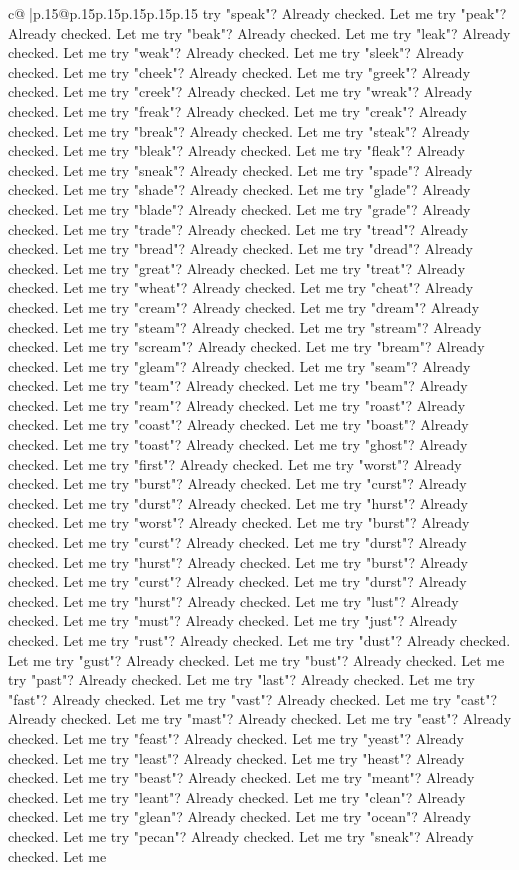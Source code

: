 \documentclass{article}
\begin{document}
{\begin{supertabular}{c@{$\;$}|p{.15\linewidth}@{}p{.15\linewidth}p{.15\linewidth}p{.15\linewidth}p{.15\linewidth}p{.15\linewidth}}
{{{try "speak"? Already checked. Let me try "peak"? Already checked. Let me try "beak"? Already checked. Let me try "leak"? Already checked. Let me try "weak"? Already checked. Let me try "sleek"? Already checked. Let me try "cheek"? Already checked. Let me try "greek"? Already checked. Let me try "creek"? Already checked. Let me try "wreak"? Already checked. Let me try "freak"? Already checked. Let me try "creak"? Already checked. Let me try "break"? Already checked. Let me try "steak"? Already checked. Let me try "bleak"? Already checked. Let me try "fleak"? Already checked. Let me try "sneak"? Already checked. Let me try "spade"? Already checked. Let me try "shade"? Already checked. Let me try "glade"? Already checked. Let me try "blade"? Already checked. Let me try "grade"? Already checked. Let me try "trade"? Already checked. Let me try "tread"? Already checked. Let me try "bread"? Already checked. Let me try "dread"? Already checked. Let me try "great"? Already checked. Let me try "treat"? Already checked. Let me try "wheat"? Already checked. Let me try "cheat"? Already checked. Let me try "cream"? Already checked. Let me try "dream"? Already checked. Let me try "steam"? Already checked. Let me try "stream"? Already checked. Let me try "scream"? Already checked. Let me try "bream"? Already checked. Let me try "gleam"? Already checked. Let me try "seam"? Already checked. Let me try "team"? Already checked. Let me try "beam"? Already checked. Let me try "ream"? Already checked. Let me try "roast"? Already checked. Let me try "coast"? Already checked. Let me try "boast"? Already checked. Let me try "toast"? Already checked. Let me try "ghost"? Already checked. Let me try "first"? Already checked. Let me try "worst"? Already checked. Let me try "burst"? Already checked. Let me try "curst"? Already checked. Let me try "durst"? Already checked. Let me try "hurst"? Already checked. Let me try "worst"? Already checked. Let me try "burst"? Already checked. Let me try "curst"? Already checked. Let me try "durst"? Already checked. Let me try "hurst"? Already checked. Let me try "burst"? Already checked. Let me try "curst"? Already checked. Let me try "durst"? Already checked. Let me try "hurst"? Already checked. Let me try "lust"? Already checked. Let me try "must"? Already checked. Let me try "just"? Already checked. Let me try "rust"? Already checked. Let me try "dust"? Already checked. Let me try "gust"? Already checked. Let me try "bust"? Already checked. Let me try "past"? Already checked. Let me try "last"? Already checked. Let me try "fast"? Already checked. Let me try "vast"? Already checked. Let me try "cast"? Already checked. Let me try "mast"? Already checked. Let me try "east"? Already checked. Let me try "feast"? Already checked. Let me try "yeast"? Already checked. Let me try "least"? Already checked. Let me try "heast"? Already checked. Let me try "beast"? Already checked. Let me try "meant"? Already checked. Let me try "leant"? Already checked. Let me try "clean"? Already checked. Let me try "glean"? Already checked. Let me try "ocean"? Already checked. Let me try "pecan"? Already checked. Let me try "sneak"? Already checked. Let me }}}
\end{supertabular}}
\end{document}
